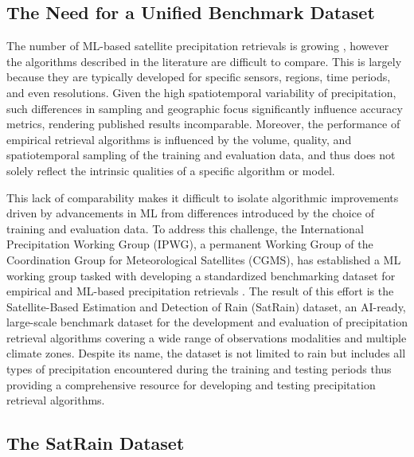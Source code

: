 \documentclass[11pt]{article}
\providecommand{\DIFaddend}{} %
\begin{document}
\DIFaddend \subsection{The Need for a Unified Benchmark Dataset}

The number of ML-based satellite precipitation retrievals is
growing \citep{Sano2018PNPR, Amell2025Probabilistic}, however the algorithms
described in the literature are difficult to compare. This is largely because
they are typically developed for specific sensors, regions, time periods, and
even resolutions. Given the high spatiotemporal variability of precipitation,
such differences in sampling and geographic focus significantly influence
accuracy metrics, rendering published results incomparable. Moreover, the
performance of empirical retrieval algorithms is influenced by the volume,
quality, and spatiotemporal sampling of the training and evaluation data, and
thus does not solely reflect the intrinsic qualities of a specific algorithm or
model.

This lack of comparability makes it difficult to isolate algorithmic
improvements driven by advancements in ML from differences
introduced by the choice of training and evaluation data. To address this
challenge, the International Precipitation Working Group (IPWG), a permanent
Working Group of the Coordination Group for Meteorological Satellites (CGMS),
has established a ML working group tasked with developing a
standardized benchmarking dataset for empirical and ML-based
precipitation retrievals \citep{Kubota2025IPWG}. The result of this effort is
the Satellite-Based Estimation and Detection of Rain (SatRain) dataset, an
AI-ready, large-scale benchmark dataset for the development and evaluation of
precipitation retrieval algorithms covering a wide range of observations
modalities and multiple climate zones. Despite its name, the dataset is not
limited to rain but includes all types of precipitation encountered during the
training and testing periods thus providing a comprehensive resource for
developing and testing precipitation retrieval algorithms.


\subsection{The SatRain Dataset}
\end{document}
